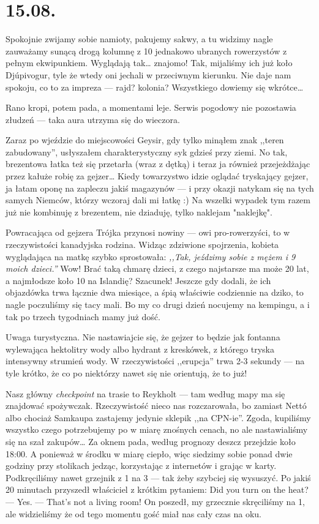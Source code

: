 \chapter {15.08.}

Spokojnie zwijamy sobie namioty, pakujemy sakwy, a tu widzimy nagle zauważamy sunącą drogą kolumnę z 10 jednakowo ubranych rowerzystów z pełnym ekwipunkiem. Wyglądają tak… znajomo! Tak, mijaliśmy ich już koło Djúpivogur, tyle że wtedy oni jechali w przeciwnym kierunku. Nie daje nam spokoju, co to za impreza --- rajd? kolonia? Wszystkiego dowiemy się wkrótce…

Rano kropi, potem pada, a momentami leje. Serwis pogodowy nie pozostawia złudzeń --- taka aura utrzyma się do wieczora.

Zaraz po wjeździe do miejscowości Geysir, gdy tylko minąłem znak ,,teren zabudowany'', usłyszałem charakterystyczny syk gdzieś przy ziemi. No tak, brezentowa łatka też się przetarła (wraz z dętką) i teraz ja również przejeżdżając przez kałuże robię za gejzer…  Kiedy towarzystwo idzie oglądać tryskający gejzer, ja łatam oponę na zapleczu jakiś magazynów --- i przy okazji natykam się na tych samych Niemców, którzy wczoraj dali mi łatkę :) Na wszelki wypadek tym razem już nie kombinuję z brezentem, nie dziaduję, tylko naklejam "naklejkę".

Powracająca od gejzera Trójka przynosi nowiny --- owi pro-rowerzyści, to w rzeczywistości kanadyjska rodzina. Widząc zdziwione spojrzenia, kobieta wyglądająca na matkę szybko sprostowała: \emph{,,Tak, jeździmy sobie z mężem i 9 moich dzieci.''} Wow! Brać taką chmarę dzieci, z czego najstarsze ma może 20 lat, a najmłodsze koło 10 na Islandię? Szacunek! Jeszcze gdy dodali, że ich objazdówka trwa łącznie dwa miesiące, a śpią właściwie codziennie na dziko, to nagle poczuliśmy się tacy mali. Bo my co drugi dzień nocujemy na kempingu, a i tak po trzech tygodniach mamy już dość.

Uwaga turystyczna. Nie nastawiajcie się, że gejzer to będzie jak fontanna wylewająca hektolitry wody albo hydrant z kreskówek, z którego tryska intensywny strumień wody. W rzeczywistości ,,erupcja'' trwa 2-3 sekundy --- na tyle krótko, że co po niektórzy nawet się nie orientują, że to już!

Nasz główny \emph{checkpoint} na trasie to Reykholt --- tam według mapy ma się znajdować spożywczak. Rzeczywistość nieco nas rozczarowała, bo zamiast Nettó albo chociaż Samkaupa zastajemy jedynie sklepik ,,na CPN-ie''. Zgoda, kupiliśmy wszystko czego potrzebujemy po w miarę znośnych cenach, no ale nastawialiśmy się na szał zakupów… Za oknem pada, według prognozy deszcz przejdzie koło 18:00. A ponieważ w środku w miarę ciepło, więc siedzimy sobie ponad dwie godziny przy stolikach jedząc, korzystając z internetów i grając w karty. Podkręciliśmy nawet grzejnik z 1 na 3 --- tak żeby szybciej się wysuszyć.
Po jakiś 20 minutach przyszedł właściciel z krótkim pytaniem: Did you turn on the heat? --- Yes. --- That’s not a living room! On poszedł, my grzecznie skręciliśmy na 1, ale widzieliśmy że od tego momentu gość miał nas cały czas na oku.

